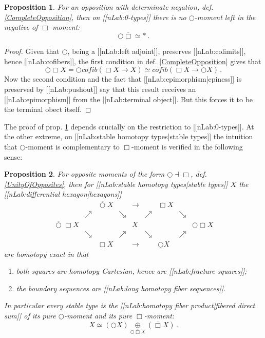 \documentclass[12pt,titlepage]{article}
\newcommand{\itexarray}[1]{\begin{matrix}#1\end{matrix}}
\theoremstyle{plain}
\newtheorem{prop}{Proposition}
\theoremstyle{definition}
\theoremstyle{remark}
\begin{document}
\begin{prop}
\label{AccuracyOfNegatives}\hypertarget{AccuracyOfNegatives}{}
For an opposition with determinate negation, def. \ref{CompleteOpposition}, then on [[nLab:0-types]] there is no $\bigcirc$-moment left in the negative of $\Box$-moment:
\begin{displaymath}
\bigcirc \overline{\Box} \simeq \ast
  \,.
\end{displaymath}
\end{prop}
\begin{proof}
Given that $\bigcirc$, being a [[nLab:left adjoint]], preserves [[nLab:colimits]], hence [[nLab:cofibers]], the first condition in def. \ref{CompleteOpposition} gives that
\begin{displaymath}
\bigcirc \overline{\Box} X
  =
  \bigcirc cofib(\Box X \to X)
  \simeq
  cofib(\Box X \to \bigcirc X)
  \,.
\end{displaymath}
Now the second condition and the fact that [[nLab:epimorphism|epiness]] is preserved by [[nLab:pushout]] say that this result receives an [[nLab:epimorphism]] from the [[nLab:terminal object]]. But this forces it to be the terminal obect itself.
\end{proof}
The proof of prop. \ref{AccuracyOfNegatives} depends crucially on the restriction to [[nLab:0-types]]. At the other extreme, on [[nLab:stable homotopy types|stable types]] the intuition that $\bigcirc$-moment is complementary to $\overline{\Box}$-moment is verified in the following sense:
\begin{prop}
\label{TheHexagon}\hypertarget{TheHexagon}{}
For opposite moments of the form $\bigcirc \dashv \Box$, def. \ref{UnityOfOpposites}, then for [[nLab:stable homotopy types|stable types]] $X$ the [[nLab:differential hexagon|hexagons]]
\begin{displaymath}
\itexarray{
    && \overline{\bigcirc} X && \longrightarrow && \overline{\Box} X
    \\
    &\nearrow& &\searrow& & \nearrow && \searrow
    \\
    \overline{\bigcirc} \Box X && && X && && \bigcirc \overline{\Box} X
    \\
    &\searrow& &\nearrow & & \searrow && \nearrow
    \\
    && \Box X && \longrightarrow && \bigcirc X
  }
\end{displaymath}
are homotopy exact in that
\begin{enumerate}%
\item both squares are homotopy Cartesian, hence are [[nLab:fracture squares]];
\item the boundary sequences are [[nLab:long homotopy fiber sequences]].
\end{enumerate}
In particular every stable type is the [[nLab:homotopy fiber product|fibered direct sum]] of its pure $\bigcirc$-moment and its pure $\overline{\Box}$-moment:
\begin{displaymath}
X \simeq (\bigcirc X) \underset{\bigcirc \overline{\Box} X}{\oplus} (\overline{\Box} X)
  \,.
\end{displaymath}
\end{prop}
\end{document}
